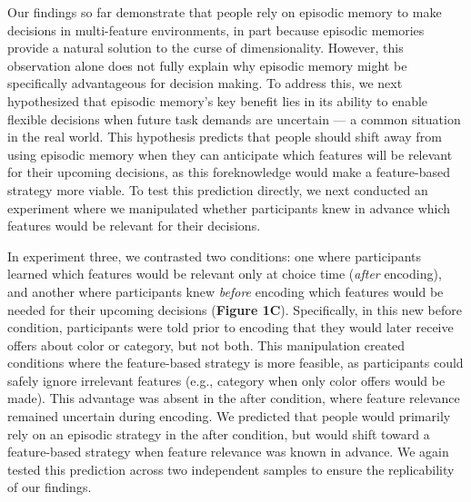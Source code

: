 \documentclass[10pt,letterpaper]{article}
\begin{document}
Our findings so far demonstrate that people rely on episodic memory to make decisions in multi-feature environments, in part because episodic memories provide a natural solution to the curse of dimensionality. However, this observation alone does not fully explain why episodic memory might be specifically advantageous for decision making. To address this, we next hypothesized that episodic memory's key benefit lies in its ability to enable flexible decisions when future task demands are uncertain --- a common situation in the real world. This hypothesis predicts that people should shift away from using episodic memory when they can anticipate which features will be relevant for their upcoming decisions, as this foreknowledge would make a feature-based strategy more viable. To test this prediction directly, we next conducted an experiment where we manipulated whether participants knew in advance which features would be relevant for their decisions.

In experiment three, we contrasted two conditions: one where participants learned which features would be relevant only at choice time (\textit{after} encoding), and another where participants knew \textit{before} encoding which features would be needed for their upcoming decisions (\textbf{Figure 1C}). Specifically, in this new before condition, participants were told prior to encoding that they would later receive offers about color or category, but not both. This manipulation created conditions where the feature-based strategy is more feasible, as participants could safely ignore irrelevant features (e.g., category when only color offers would be made). This advantage was absent in the after condition, where feature relevance remained uncertain during encoding. We predicted that people would primarily rely on an episodic strategy in the after condition, but would shift toward a feature-based strategy when feature relevance was known in advance. We again tested this prediction across two independent samples to ensure the replicability of our findings.
\end{document}
